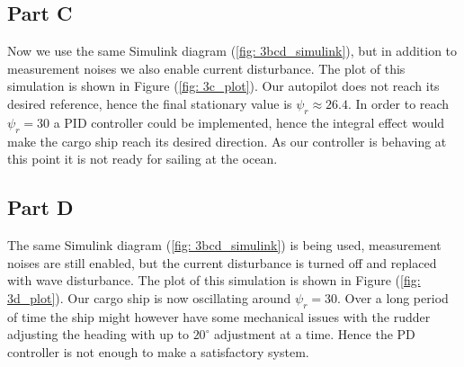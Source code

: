 \subsection{Part C}

Now we use the same Simulink diagram (\ref{fig: 3bcd_simulink}), but in addition to measurement noises we also enable current disturbance. 
The plot of this simulation is shown in Figure (\ref{fig: 3c_plot}). Our autopilot does not reach its desired reference, hence the final stationary value is $\psi_r \approx 26.4$. In order to reach $\psi_r = 30$ a PID controller could be implemented, hence the integral effect would make the cargo ship reach its desired direction. As our controller is behaving at this point it is not ready for sailing at the ocean. 

\subsection{Part D}
The same Simulink diagram (\ref{fig: 3bcd_simulink}) is being used, measurement noises are still enabled, but the current disturbance is turned off and replaced with wave disturbance. The plot of this simulation is shown in Figure (\ref{fig: 3d_plot}). Our cargo ship is now oscillating around $\psi_r = 30$. Over a long period of time the ship might however have some mechanical issues with the rudder adjusting the heading with up to $20^{\circ}$ adjustment at a time. Hence the PD controller is not enough to make a satisfactory system. 
